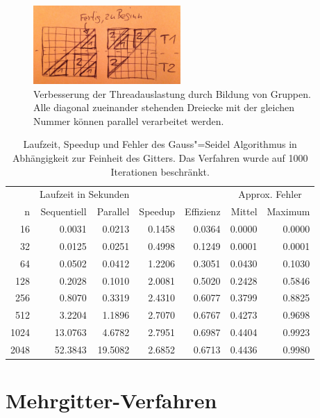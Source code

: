\documentclass[paper = a4]{scrartcl}
\begin{document}
\begin{figure}
    \centering
    \includegraphics[width=0.5\textwidth]{gaussseideldreiecke}
    \caption{Verbesserung der Threadauslastung durch Bildung von Gruppen. Alle diagonal zueinander stehenden Dreiecke mit der gleichen Nummer können parallel verarbeitet werden.}
    \label{fig:gaussseideldreiecke}
\end{figure}

\begin{table}
    \centering
    \begin{tabular}{|r|r|r|r|r|r|r|} \hline
    & \multicolumn{2}{c|}{Laufzeit in Sekunden} & & & \multicolumn{2}{c|}{Approx. Fehler} \\
    n    & Sequentiell & Parallel & Speedup & Effizienz & Mittel & Maximum \\ \hline \hline
    16   & 0.0031      & 0.0213   & 0.1458  & 0.0364    & 0.0000 & 0.0000 \\
    32   & 0.0125      & 0.0251   & 0.4998  & 0.1249    & 0.0001 & 0.0001 \\
    64   & 0.0502      & 0.0412   & 1.2206  & 0.3051    & 0.0430 & 0.1030 \\
    128  & 0.2028      & 0.1010   & 2.0081  & 0.5020    & 0.2428 & 0.5846 \\
    256  & 0.8070      & 0.3319   & 2.4310  & 0.6077    & 0.3799 & 0.8825 \\
    512  & 3.2204      & 1.1896   & 2.7070  & 0.6767    & 0.4273 & 0.9698 \\
    1024 & 13.0763     & 4.6782   & 2.7951  & 0.6987    & 0.4404 & 0.9923 \\
    2048 & 52.3843     & 19.5082  & 2.6852  & 0.6713    & 0.4436 & 0.9980 \\ \hline
    \end{tabular}
    \caption{Laufzeit, Speedup und Fehler des Gauss"=Seidel Algorithmus in Abhängigkeit zur Feinheit des Gitters. Das Verfahren wurde auf 1000 Iterationen beschränkt.}
    \label{tab:gaussseidel}
\end{table}

\section{Mehrgitter-Verfahren}
\end{document}
